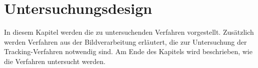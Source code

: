 \chapter{Untersuchungsdesign} %
\label{cha:untersuchungsdesign}

In diesem Kapitel werden die zu untersuchenden Verfahren vorgestellt. Zusätzlich werden Verfahren aus der
 Bildverarbeitung erläutert, die zur Untersuchung der Tracking-Verfahren notwendig sind. Am Ende des Kapitels wird
 beschrieben, wie die Verfahren untersucht werden.





